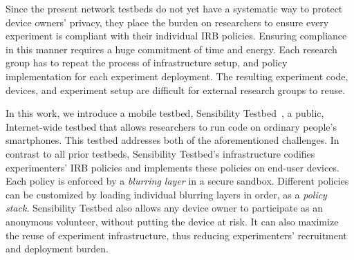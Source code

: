 Since the present network testbeds do not yet have a systematic 
way to protect device owners' privacy, they place 
the burden on researchers to ensure every 
experiment is compliant with their individual IRB policies.
Ensuring compliance in this manner requires a huge commitment 
of time and energy. Each research group has to repeat the process 
of infrastructure setup, and policy implementation for each 
experiment deployment. The resulting 
experiment code, devices, and experiment setup are 
difficult for external research groups to reuse.



In this work, we introduce a mobile testbed, 
Sensibility Testbed~\cite{sensibility, zhuang2015privacy}, a public, 
Internet-wide testbed that allows researchers to run code on ordinary
people's smartphones. This testbed addresses both of the 
aforementioned challenges.
%   
In contrast to all prior testbeds, Sensibility Testbed's
infrastructure codifies experimenters' IRB policies and 
implements these policies on end-user devices. Each 
policy is enforced by a \textit{blurring layer} in a secure 
sandbox. Different policies can be customized by loading
individual blurring layers in order, as a \textit{policy stack}. 
Sensibility Testbed also allows
any device owner to participate as an anonymous volunteer,
without putting the device at risk. It can also 
maximize the reuse of experiment infrastructure, thus reducing 
experimenters' recruitment and deployment burden. 
%

